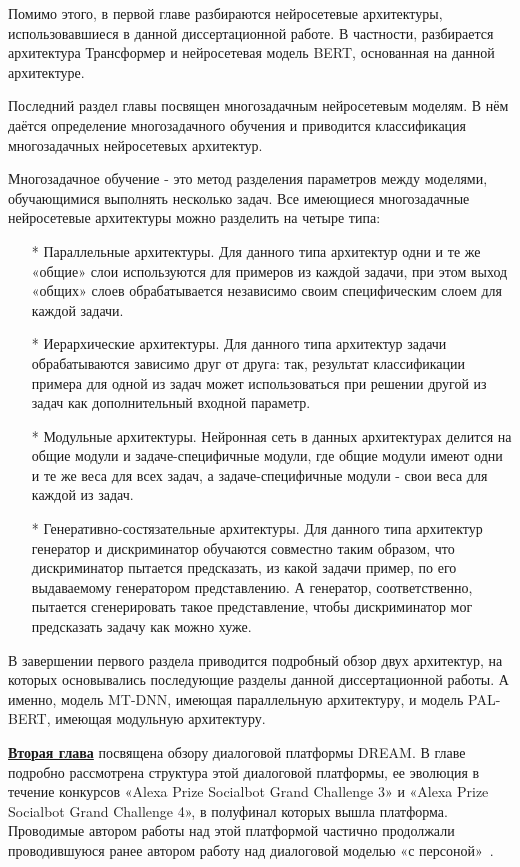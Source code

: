 Помимо этого, в первой главе разбираются нейросетевые архитектуры, использовавшиеся в данной диссертационной работе. В частности, разбирается архитектура Трансформер и нейросетевая модель {BERT}, основанная на данной архитектуре.

Последний раздел главы посвящен многозадачным нейросетевым моделям. В нём даётся определение многозадачного обучения и приводится классификация многозадачных нейросетевых архитектур.

Многозадачное обучение - это метод разделения параметров между моделями, обучающимися выполнять несколько задач. Все имеющиеся многозадачные нейросетевые архитектуры можно разделить на четыре типа:
\begin{itemize}
\item[*] Параллельные архитектуры. Для данного типа архитектур одни и те же «общие» слои используются для примеров из каждой задачи, при этом выход «общих» слоев обрабатывается независимо своим специфическим слоем для каждой задачи. 
\item[*] Иерархические архитектуры. Для данного типа архитектур задачи обрабатываются зависимо друг от друга: так, результат классификации примера для одной из задач может использоваться при решении другой из задач как дополнительный входной параметр.
\item[*] Модульные архитектуры. Нейронная сеть в данных архитектурах делится на общие модули и задаче-специфичные модули, где общие модули имеют одни и те же веса для всех задач, а задаче-специфичные модули - свои веса для каждой из задач.
\item[*] Генеративно-состязательные архитектуры. Для данного типа архитектур генератор и дискриминатор обучаются совместно таким образом, что дискриминатор пытается предсказать, из какой задачи пример, по его выдаваемому генератором представлению. А генератор, соответственно, пытается сгенерировать такое представление, чтобы дискриминатор мог предсказать задачу как можно хуже. 
\end{itemize}
В завершении первого раздела приводится подробный обзор двух архитектур, на которых основывались последующие разделы данной диссертационной работы. А именно, модель {MT-DNN}, имеющая параллельную архитектуру, и модель {PAL-BERT}, имеющая модульную архитектуру. 

\underline{\textbf{Вторая глава}} посвящена обзору диалоговой платформы DREAM. В главе подробно рассмотрена структура этой диалоговой платформы, ее эволюция в течение конкурсов «Alexa Prize Socialbot Grand Challenge 3» и «Alexa Prize Socialbot Grand Challenge 4», в полуфинал которых вышла платформа.  Проводимые автором работы над этой платформой частично продолжали проводившуюся ранее автором работу над диалоговой моделью «с персоной»~\cite{Болотин_Карпов_Рашков_Шкурак_2019}.

